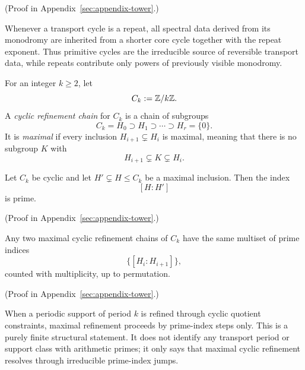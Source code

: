 (Proof in Appendix~\ref{sec:appendix-tower}.)

\begin{remark}
\label{rem:primitive-core-spectral-data}
Whenever a transport cycle is a repeat, all spectral data derived from its
monodromy are inherited from a shorter core cycle together with the repeat
exponent. Thus primitive cycles are the irreducible source of reversible
transport data, while repeats contribute only powers of previously visible
monodromy.
\end{remark}

\begin{definition}
\label{def:cyclic-refinement-chain}
For an integer \(k\ge 2\), let
\[
C_k:=\mathbb{Z}/k\mathbb{Z}.
\]
A \emph{cyclic refinement chain} for \(C_k\) is a chain of subgroups
\[
C_k=H_0\supset H_1\supset\cdots\supset H_r=\{0\}.
\]
It is \emph{maximal} if every inclusion \(H_{i+1}\subsetneq H_i\) is maximal,
meaning that there is no subgroup \(K\) with
\[
H_{i+1}\subsetneq K\subsetneq H_i.
\]
\end{definition}

\begin{proposition}
\label{prop:cyclic-refinement-prime-step}
Let \(C_k\) be cyclic and let \(H'\subsetneq H\le C_k\) be a maximal inclusion.
Then the index
\[
[H:H']
\]
is prime.
\end{proposition}

(Proof in Appendix~\ref{sec:appendix-tower}.)

\begin{theorem}
\label{thm:cyclic-refinement-prime-invariant}
Any two maximal cyclic refinement chains of \(C_k\) have the same multiset of
prime indices
\[
\{[H_i:H_{i+1}]\},
\]
counted with multiplicity, up to permutation.
\end{theorem}

(Proof in Appendix~\ref{sec:appendix-tower}.)

\begin{remark}
\label{rem:periodic-support-prime-refinement}
When a periodic support of period \(k\) is refined through cyclic quotient
constraints, maximal refinement proceeds by prime-index steps only. This is a
purely finite structural statement. It does not identify any transport period
or support class with arithmetic primes; it only says that maximal cyclic
refinement resolves through irreducible prime-index jumps.
\end{remark}

